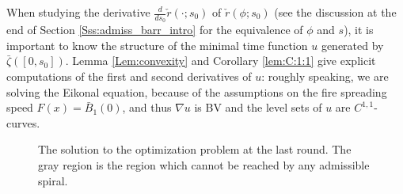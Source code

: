 \documentclass[reqno]{amsart}
\newcounter{assu}
\theoremstyle{definition} \newtheorem{definition}{Definition}[section]
\theoremstyle{definition} \newtheorem{remark}[definition]{Remark}
\theoremstyle{plain} \newtheorem{lemma}[definition]{Lemma}
\theoremstyle{plain} \newtheorem{proposition}[definition]{Proposition}
\theoremstyle{plain} \newtheorem{theorem}[definition]{Theorem}
\theoremstyle{plain} \newtheorem{corollary}[definition]{Corollary}
\theoremstyle{definition} \newtheorem{example}[definition]{Example}
\theoremstyle{plain} \newtheorem{claim}[clai]{Claim}
\theoremstyle{definition} \newtheorem{assumption}[definition]{Assumption}
\theoremstyle{definition} \newtheorem{observation}[definition]{Observation}
\newcommand{\1}{\mathbbm 1}
\numberwithin{equation}{section} %
\theoremstyle{plain} \newtheorem*{theorem*}{Theorem}
\theoremstyle{plain} \newtheorem{mthm}[maintheorem]{Main Theorem}
\theoremstyle{plain} \newtheorem*{mthm*}{Main Theorem}
\theoremstyle{plain} \newtheorem*{conjecture*}{Conjecture}
\theoremstyle{plain} \newtheorem{conjecture}[definition]{Conjecture}
\theoremstyle{plain} \newtheorem*{problem*}{Problem}
\begin{document}
When studying the derivative $\frac{d}{ds_0} \check r(\cdot;s_0)$ of $\check r(\phi;s_0)$ (see the discussion at the end of Section \ref{Sss:admiss_barr_intro} for the equivalence of $\phi$ and $s$), it is important to know the structure of the minimal time function $u$ generated by $\bar \zeta([0,s_0])$. Lemma \ref{Lem:convexity} and Corollary \ref{lem:C:1:1} give explicit computations of the first and second derivatives of $u$: roughly speaking, we are solving the Eikonal equation, because of the assumptions on the fire spreading speed $F(x) = \bar B_1(0)$, and thus $\nabla u$ is BV and the level sets of $u$ are $C^{1,1}$-curves.

\begin{figure}
\resizebox{.75\textwidth}{!}{}
\caption{The solution to the optimization problem at the last round. The gray region is the region which cannot be reached by any admissible spiral.}
\label{Fig:optimal_last_intro}
\end{figure}
\end{document}
